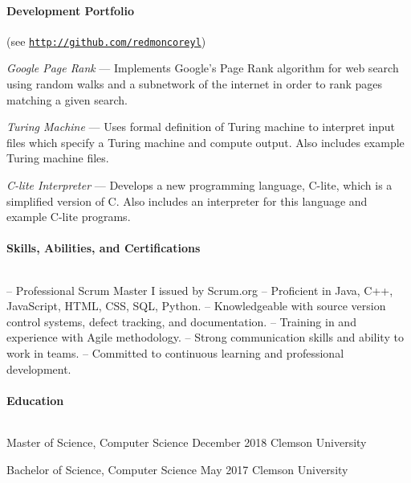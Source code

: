 \documentclass{article}
\begin{document}
  \paragraph{Development Portfolio} \hfill (see \href{http://github.com/redmoncoreyl}{\texttt{http://github.com/redmoncoreyl}})%

  \hangindent=0.5in
  \textit{Google Page Rank} --- Implements Google's Page Rank algorithm
  for web search using random walks and a subnetwork of the internet in order to
  rank pages matching a given search.

  \hangindent=0.5in
	\textit{Turing Machine} --- Uses formal definition of Turing machine to
  interpret input files which specify a Turing machine and compute output. Also includes
  example Turing machine files.

  \hangindent=0.5in
	\textit{C-lite Interpreter} --- Develops a new programming language, C-lite, which
  is a simplified version of C. Also includes an interpreter for this language and
  example C-lite programs.

  \paragraph{Skills, Abilities, and Certifications} $ $

  \hangindent=0.4in
  -- Professional Scrum Master I issued by Scrum.org \newline
  -- Proficient in Java, C++, JavaScript, HTML, CSS, SQL, Python. \newline
  -- Knowledgeable with source version control systems, defect tracking, and documentation. \newline
  -- Training in and experience with Agile methodology. \newline
  -- Strong communication skills and ability to work in teams. \newline
  -- Committed to continuous learning and professional development.

  \paragraph{Education} $ $

  \hangindent=0.8in
  Master of Science, Computer Science \hfill December 2018 \newline
  Clemson University \newline

  \hangindent=0.8in
  Bachelor of Science, Computer Science \hfill May 2017 \newline
  Clemson University
  
\end{document}

